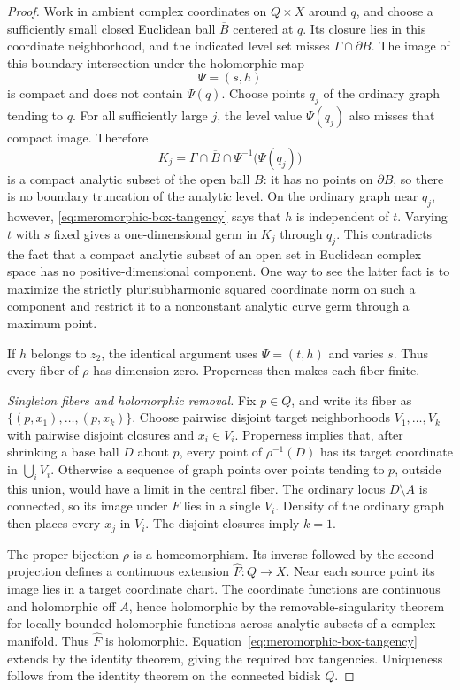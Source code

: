 \begin{proof}
Work in ambient complex coordinates on $Q\times X$ around $q$, and choose
a sufficiently small closed Euclidean ball $\overline B$ centered at $q$.
Its closure lies in this coordinate neighborhood, and the indicated
level set misses $\Gamma\cap\partial B$.  The image of this boundary
intersection under the holomorphic map
\[
 \Psi=(s,h)
\]
is compact and does not contain $\Psi(q)$.  Choose points $q_j$ of the
ordinary graph tending to $q$.  For all sufficiently large $j$, the level
value $\Psi(q_j)$ also misses that compact image.  Therefore
\[
 K_j=\Gamma\cap\overline B\cap\Psi^{-1}\bigl(\Psi(q_j)\bigr)
\]
is a compact analytic subset of the open ball $B$: it has no points on
$\partial B$, so there is no boundary truncation of the analytic level.
On the ordinary graph near $q_j$, however,
\eqref{eq:meromorphic-box-tangency} says that $h$ is independent of $t$.
Varying $t$ with $s$ fixed gives a one-dimensional germ in $K_j$ through
$q_j$.  This contradicts the fact that a compact analytic subset of an
open set in Euclidean complex space has no positive-dimensional
component.  One way to see the latter fact is to maximize the strictly
plurisubharmonic squared coordinate norm on such a component and restrict
it to a nonconstant analytic curve germ through a maximum point.

If $h$ belongs to $z_2$, the identical argument uses $\Psi=(t,h)$ and
varies $s$.  Thus every fiber of $\rho$ has dimension zero.  Properness
then makes each fiber finite.

\emph{Singleton fibers and holomorphic removal.}
Fix $p\in Q$, and write its fiber as
$\{(p,x_1),\ldots,(p,x_k)\}$.  Choose pairwise disjoint target
neighborhoods $V_1,\ldots,V_k$ with pairwise disjoint closures and
$x_i\in V_i$.  Properness implies that, after shrinking a base ball
$D$ about $p$, every point of $\rho^{-1}(D)$ has its target coordinate in
$\bigcup_iV_i$.  Otherwise a sequence of graph points over points tending
to $p$, outside this union, would have a limit in the central fiber.
The ordinary locus $D\setminus A$ is connected, so its image under $F$
lies in a single $V_i$.  Density of the ordinary graph then places every
$x_j$ in $\overline V_i$.  The disjoint closures imply $k=1$.

The proper bijection $\rho$ is a homeomorphism.  Its inverse followed by
the second projection defines a continuous extension
$\widehat F:Q\to X$.  Near each source point its image lies in a target
coordinate chart.  The coordinate functions are continuous and
holomorphic off $A$, hence holomorphic by the removable-singularity
theorem for locally bounded holomorphic functions across analytic
subsets of a complex manifold.  Thus $\widehat F$ is holomorphic.
Equation~\eqref{eq:meromorphic-box-tangency} extends by the identity
theorem, giving the required box tangencies.  Uniqueness follows from
the identity theorem on the connected bidisk $Q$.
\end{proof}

